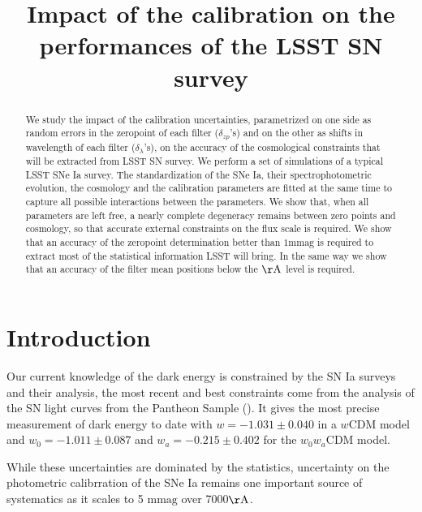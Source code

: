 \documentclass[\docopts]{\docclass}
\begin{document}
\title{ Impact of the calibration on the performances of the LSST SN survey }

\maketitlepre

\begin{abstract}
We study the impact of the calibration uncertainties, parametrized on one side as random errors in the zeropoint of each filter ($\delta_{zp}$'s) and on the other as shifts in wavelength of each filter ($\delta_\lambda$'s), on the accuracy of the cosmological constraints that will be extracted from LSST SN survey.
We perform a set of simulations of a typical LSST SNe Ia survey.
The standardization of the SNe Ia, their spectrophotometric evolution, the cosmology and the calibration parameters are fitted at the same time to capture all possible interactions between the parameters.
We show that, when all parameters are left free, a nearly complete degeneracy remains between zero points and cosmology, so that accurate external constraints on the flux scale is required. We show that an accuracy of the zeropoint determination better than $1\mathrm{mmag}$ is required to extract most of the statistical information LSST will bring. In the same way we show that an accuracy of the filter mean positions below the $\mathrm{\AA}$ level is required.
\end{abstract}


\maketitlepost

% 

\section{Introduction}
\label{sec:intro}

Our current knowledge of the dark energy is constrained by the SN Ia surveys and their analysis, the most recent and best constraints come from the analysis of the SN light curves from the Pantheon Sample (\cite{1710.00845}).
It gives the most precise measurement of dark energy to date with $w = -1.031 \pm 0.040$ in a $w\text{CDM}$ model and $w_0 = -1.011 \pm 0.087$ and $w_a = -0.215 \pm 0.402$ for the $w_0w_a\text{CDM}$ model.

While these uncertainties are dominated by the statistics, uncertainty on the photometric calibrration of the SNe Ia remains one important source of systematics as it scales to 5 $\mathrm{mmag}$ over 7000$\mathrm{\AA}$.
\end{document}

